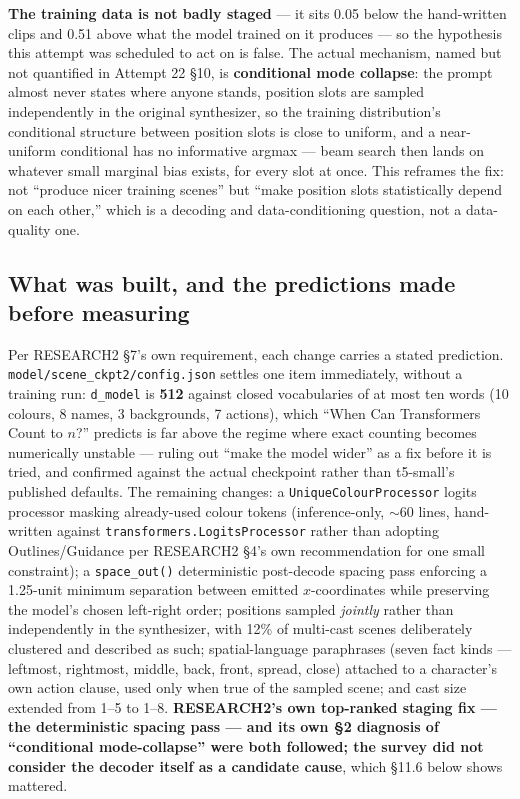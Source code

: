 \documentclass[11pt]{article}
\newcommand{\secsym}{\S}
\begin{document}
\textbf{The training data is not badly staged} --- it sits 0.05 below the
hand-written clips and 0.51 above what the model trained on it produces
--- so the hypothesis this attempt was scheduled to act on is false. The
actual mechanism, named but not quantified in Attempt 22 \secsym10, is
\textbf{conditional mode collapse}: the prompt almost never states where
anyone stands, position slots are sampled independently in the original
synthesizer, so the training distribution's conditional structure between
position slots is close to uniform, and a near-uniform conditional has no
informative argmax --- beam search then lands on whatever small marginal
bias exists, for every slot at once. This reframes the fix: not ``produce
nicer training scenes'' but ``make position slots statistically depend on
each other,'' which is a decoding and data-conditioning question, not a
data-quality one.

\subsection{What was built, and the predictions made before measuring}
\label{sec:whatbuilt}

Per RESEARCH2 \secsym7's own requirement, each change carries a stated
prediction. \texttt{model/scene\_ckpt2/config.json} settles one item
immediately, without a training run: \texttt{d\_model} is \textbf{512}
against closed vocabularies of at most ten words (10 colours, 8 names, 3
backgrounds, 7 actions), which ``When Can Transformers Count to $n$?''
\cite{yehudai2024counttransformers} predicts is far above the regime
where exact counting becomes numerically unstable --- ruling out ``make
the model wider'' as a fix before it is tried, and confirmed against the
actual checkpoint rather than t5-small's published defaults. The
remaining changes: a \texttt{UniqueColourProcessor} logits processor
masking already-used colour tokens (inference-only, $\sim$60 lines,
hand-written against \texttt{transformers.LogitsProcessor} rather than
adopting Outlines/Guidance per RESEARCH2 \secsym4's own recommendation
for one small constraint); a \texttt{space\_out()} deterministic
post-decode spacing pass enforcing a 1.25-unit minimum separation between
emitted $x$-coordinates while preserving the model's chosen left-right
order; positions sampled \emph{jointly} rather than independently in the
synthesizer, with 12\% of multi-cast scenes deliberately clustered and
described as such; spatial-language paraphrases (seven fact kinds ---
leftmost, rightmost, middle, back, front, spread, close) attached to a
character's own action clause, used only when true of the sampled scene;
and cast size extended from 1--5 to 1--8. \textbf{RESEARCH2's own
top-ranked staging fix --- the deterministic spacing pass --- and its own
\secsym2 diagnosis of ``conditional mode-collapse'' were both followed;
the survey did not consider the decoder itself as a candidate cause},
which \secsym11.6 below shows mattered.
\end{document}
